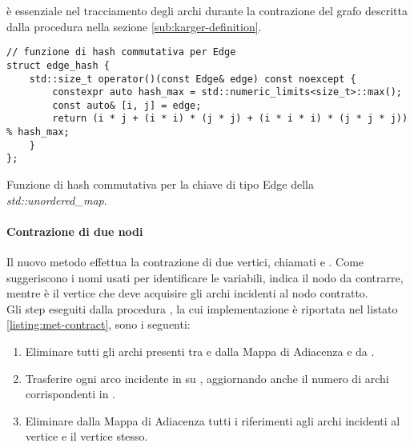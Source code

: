 \noindent {} è essenziale nel tracciamento degli archi durante la contrazione del grafo descritta dalla procedura   nella sezione \ref{sub:karger-definition}.\\

\begin{listing}[!ht]
\begin{verbatim}
// funzione di hash commutativa per Edge
struct edge_hash {
    std::size_t operator()(const Edge& edge) const noexcept {
        constexpr auto hash_max = std::numeric_limits<size_t>::max();
        const auto& [i, j] = edge;
        return (i * j + (i * i) * (j * j) + (i * i * i) * (j * j * j)) % hash_max;
    }
};
\end{verbatim}
\caption{Funzione di hash commutativa per la chiave di tipo Edge della \textit{std::unordered\_map}.}
\label{listing:hash-fun}
\end{listing}

\paragraph{Contrazione di due nodi}
\label{par:contraction}

Il nuovo metodo  effettua la contrazione di due vertici, chiamati  e . Come suggeriscono i nomi usati per identificare le variabili,  indica il nodo da contrarre, mentre  è il vertice che deve acquisire gli archi incidenti al nodo contratto. \\

\noindent Gli step eseguiti dalla procedura , la cui implementazione è riportata nel listato \ref{listing:met-contract}, sono i seguenti:

\begin{enumerate}
    \item Eliminare tutti gli archi presenti tra
       e  dalla Mappa di Adiacenza e da .

    \item Trasferire ogni arco incidente in
       su , aggiornando anche il numero di archi corrispondenti in .

    \item Eliminare dalla Mappa di Adiacenza tutti i riferimenti agli archi incidenti al vertice  e il vertice stesso.
\end{enumerate}

